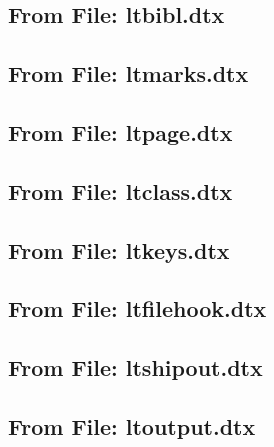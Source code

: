 \documentclass{l3in2edoc}
\begin{document}
\leavevmode


\subsection{From File: ltbibl.dtx}

\leavevmode


\subsection{From File: ltmarks.dtx}

\leavevmode


\subsection{From File: ltpage.dtx}

\leavevmode


\subsection{From File: ltclass.dtx}

\leavevmode


\subsection{From File: ltkeys.dtx}

\leavevmode


\subsection{From File: ltfilehook.dtx}

\leavevmode


\subsection{From File: ltshipout.dtx}

\leavevmode


\subsection{From File: ltoutput.dtx}
\end{document}

